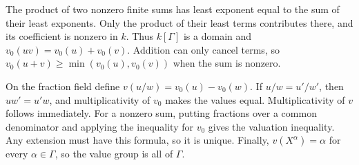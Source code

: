 The product of two nonzero finite sums has least exponent equal to the sum of their least exponents. Only the product of their least terms contributes there, and its coefficient is nonzero in $k$. Thus $k[\Gamma]$ is a domain and $v_0(uv)=v_0(u)+v_0(v)$. Addition can only cancel terms, so $v_0(u+v)\geq\min(v_0(u),v_0(v))$ when the sum is nonzero.

On the fraction field define $v(u/w)=v_0(u)-v_0(w)$. If $u/w=u'/w'$, then $uw'=u'w$, and multiplicativity of $v_0$ makes the values equal. Multiplicativity of $v$ follows immediately. For a nonzero sum, putting fractions over a common denominator and applying the inequality for $v_0$ gives the valuation inequality. Any extension must have this formula, so it is unique. Finally, $v(X^\alpha)=\alpha$ for every $\alpha\in\Gamma$, so the value group is all of $\Gamma$.
